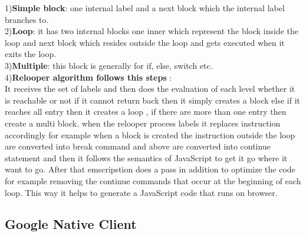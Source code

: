 \documentclass[23pt]{article}
\begin{document}
{1)\textbf{Simple block}: one internal label and a next block which the internal label branches to.\\
2)\textbf{Loop}: it has two internal blocks one inner which represent the block inside the loop and next block which resides outside the loop and gets executed when it exits the loop. \\
3)\textbf{Multiple}: this block is generally for if, else, switch etc.\\ 
4)\textbf{Relooper algorithm follows this steps} : \\
It receives the set of labels and then does the evaluation of each level whether it is reachable or not if it cannot return back then it simply creates a block else if it reaches all entry then it creates a loop , if there are more than one entry then create a multi block. when the relooper process labels it replaces instruction accordingly for example when a block is created  the instruction outside the loop are converted into break command and above are converted into continue statement and then it follows the semantics of JavaScript to get it go where it want to go. After that emscripstion does a pass in addition to optimize the code for example removing the continue commands that occur at the beginning of each loop. This way it helps to generate a JavaScript code that runs on browser.  \par}
\subsection{Google Native Client}
\end{document}
